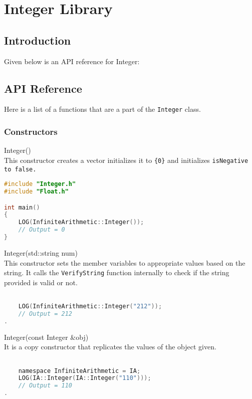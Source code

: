 
\section{Integer Library}

\subsection{Introduction}
Given below is an API reference for Integer:

\subsection{API Reference}

Here is a list of a functions that are a part of the \verb|Integer| class. 

\subsubsection{Constructors} \vspace*{1em}

{\ttfamily \large Integer()} \\[2mm]
This constructor creates a vector initializes it to \verb|{0}| and initializes \tt{isNegative} to \tt{false}.
\vspace*{1em}
\begin{lstlisting}[language = C]
#include "Integer.h"
#include "Float.h"

int main()
{
	LOG(InfiniteArithmetic::Integer());
	// Output = 0
}
\end{lstlisting}
\vspace*{1em}


\noindent
{\ttfamily \large Integer(std::string num)} \\[2mm]
This constructor sets the member variables to appropriate values based on the string. It calls the \verb|VerifyString| function internally to check if the string provided is valid or not.
\vspace*{1em}
\begin{lstlisting}[language = C]

	LOG(InfiniteArithmetic::Integer("212"));
	// Output = 212
.
\end{lstlisting}
\vspace*{1em}


\noindent
{\ttfamily \large Integer(const Integer \&obj)} \\[2mm]
It is a copy constructor that replicates the values of the object given.
\vspace*{1em}
\begin{lstlisting}[language = C]

	namespace InfiniteArithmetic = IA;
	LOG(IA::Integer(IA::Integer("110")));
	// Output = 110
.
\end{lstlisting}
\vspace*{1em}


